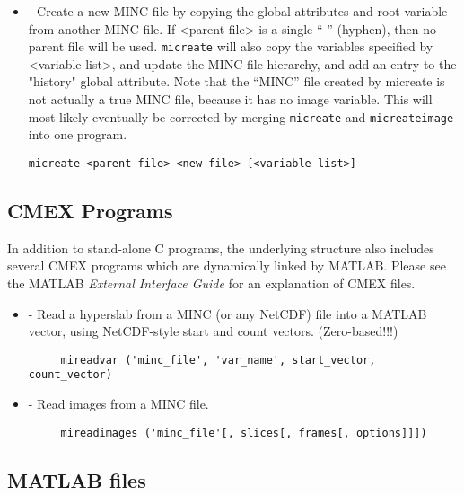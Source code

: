 \begin {itemize}
\item {} - Create a new MINC file by copying the global 
attributes and root variable from another MINC file.  If <parent file>
is a single ``-'' (hyphen), then no parent file will be used.
\verb|micreate| will also copy the variables specified by <variable
list>, and update the MINC file hierarchy, and add an entry to the
"history" global attribute.  Note that the ``MINC'' file created by
micreate is not actually a true MINC file, because it has no image
variable.  This will most likely eventually be corrected by merging
\verb|micreate| and \verb|micreateimage| into one program.
\begin{verbatim}
micreate <parent file> <new file> [<variable list>]
\end{verbatim}

\end{itemize}


\subsection{CMEX Programs}

In addition to stand-alone C programs, the underlying structure also includes
several CMEX programs which are dynamically linked by MATLAB.  Please see the
MATLAB {\em External Interface Guide} for an explanation of CMEX files.

\begin{itemize}

\item {} - Read a hyperslab from a MINC (or any NetCDF) file into a MATLAB
    vector, using NetCDF-style start and count vectors.  (Zero-based!!!)  
\begin{verbatim}
     mireadvar ('minc_file', 'var_name', start_vector, count_vector)
\end{verbatim}

\item {} - Read images from a MINC file.
\begin{verbatim}
     mireadimages ('minc_file'[, slices[, frames[, options]]]) 
\end{verbatim}

\end{itemize}


\subsection{MATLAB files}
\label{emma_reference}


% 




